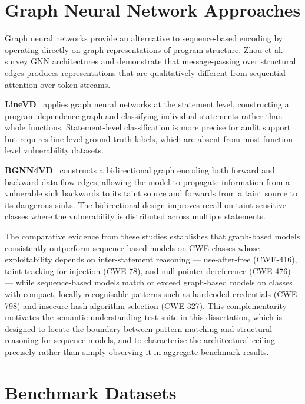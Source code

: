 \section{Graph Neural Network Approaches}

Graph neural networks provide an alternative to sequence-based encoding by operating
directly on graph representations of program structure.
Zhou et al.~\cite{zhou2020gnn} survey GNN architectures and demonstrate that message-passing over
structural edges produces representations that are qualitatively different from sequential
attention over token streams.

\textbf{LineVD}~\cite{hin2022linevd} applies graph neural networks at the statement
level, constructing a program dependence graph and classifying individual statements rather
than whole functions.
Statement-level classification is more precise for audit support but requires line-level
ground truth labels, which are absent from most function-level vulnerability datasets.

\textbf{BGNN4VD}~\cite{cao2021bgnn4vd} constructs a bidirectional graph encoding both
forward and backward data-flow edges, allowing the model to propagate information from a
vulnerable sink backwards to its taint source and forwards from a taint source to its
dangerous sinks.
The bidirectional design improves recall on taint-sensitive classes where the vulnerability
is distributed across multiple statements.

The comparative evidence from these studies establishes that graph-based models
consistently outperform sequence-based models on CWE classes whose exploitability depends
on inter-statement reasoning --- use-after-free (CWE-416), taint tracking for injection
(CWE-78), and null pointer dereference (CWE-476) --- while sequence-based models match or
exceed graph-based models on classes with compact, locally recognisable patterns such as
hardcoded credentials (CWE-798) and insecure hash algorithm selection (CWE-327).
This complementarity motivates the semantic understanding test suite in this dissertation,
which is designed to locate the boundary between pattern-matching and structural reasoning
for sequence models, and to characterise the architectural ceiling precisely rather than
simply observing it in aggregate benchmark results.

\section{Benchmark Datasets}

